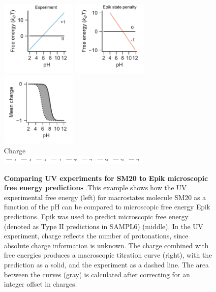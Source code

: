 \documentclass[9pt,lineno,final]{elife}
\begin{document}
\begin{figure}[H]
	\centering
	\includegraphics[width=0.33\textwidth]{Reports/Experiment-free-energy-SM20-titled.pdf}
	\includegraphics[width=0.33\textwidth]{Reports/Epik-free-energy-free-energy-SM20-titled}
	\includegraphics[width=0.33\textwidth]{Reports/Epik-free-energy-virtual-titration-SM20.pdf}\\
	Charge \\
	\includegraphics[width=0.66\textwidth, trim={2cm 0 2cm 0},clip]{Reports/overview-charge-legend-SM03.pdf}
		\caption{{\bf Comparing UV experiments for SM20 to Epik microscopic free energy predictions} .This example shows how the UV experimental free energy (left) for macrostates molecule SM20 as a function of the pH can be compared to microscopic free energy Epik predictions. Epik was used to predict microscopic free energy (denoted as Type II predictions in SAMPL6) (middle). In the UV experiment, charge reflects the number of protonations, since absolute charge information is unknown. The charge combined with free energies produces a macroscopic titration curve (right), with the prediction as a solid, and the experiment as a dashed line. The area between the curves (gray) is calculated after correcting for an integer offset in charges.  
	\label{fig:epikii-prediction}}
\end{figure}
\end{document}
